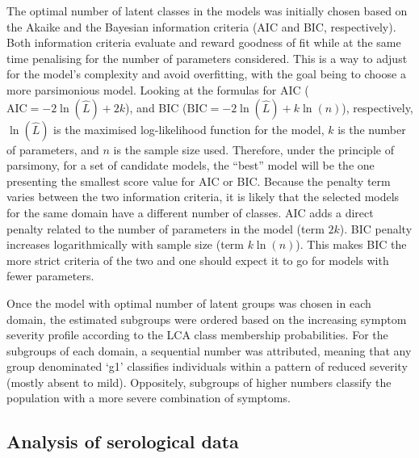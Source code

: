 The optimal number of latent classes in the models was initially chosen based on the Akaike and the Bayesian information criteria (AIC and BIC, respectively).
Both information criteria evaluate and reward goodness of fit while at the same time penalising for the number of parameters considered.
This is a way to adjust for the model's complexity and avoid overfitting, with the goal being to choose a more parsimonious model.
Looking at the formulas for AIC ($\text{AIC} = -2\ln(\hat{L}) + 2k$), and BIC ($\text{BIC} = -2\ln(\hat{L}) + k\ln(n)$), respectively, $\ln(\hat{L})$ is the maximised log-likelihood function for the model, $k$ is the number of parameters, and $n$ is the sample size used.
Therefore, under the principle of parsimony, for a set of candidate models, the ``best'' model will be the one presenting the smallest score value for AIC or BIC.
Because the penalty term varies between the two information criteria, it is likely that the selected models for the same domain have a different number of classes.
AIC adds a direct penalty related to the number of parameters in the model (term $2k$).
BIC penalty increases logarithmically with sample size (term $k\ln(n)$).
This makes BIC the more strict criteria of the two and one should expect it to go for models with fewer parameters.

Once the model with optimal number of latent groups was chosen in each domain, the estimated subgroups were ordered based on the increasing symptom severity profile according to the LCA class membership probabilities.
For the subgroups of each domain, a sequential number was attributed, meaning that any group denominated `g1' classifies individuals within a pattern of reduced severity (mostly absent to mild).
Oppositely, subgroups of higher numbers classify the population with a more severe combination of symptoms.


\subsection{Analysis of serological data}

